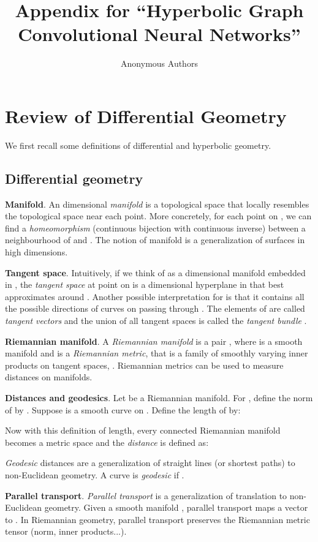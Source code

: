 \documentclass{article}
\title{Appendix for ``Hyperbolic Graph Convolutional Neural Networks''}
\author{Anonymous Authors
}
\newcommand{\xhdr}[1]{{\noindent\bfseries #1}.}
\begin{document}
\maketitle

\appendix
\section{Review of Differential Geometry}\label{appendix:diff_geom}
We first recall some definitions of differential and hyperbolic geometry.

\subsection{Differential geometry}
\xhdr{Manifold} An dimensional \textit{manifold}  is a topological space that locally resembles the topological space  near each point. 
More concretely, for each point  on , we can find a \textit{homeomorphism} (continuous bijection with continuous inverse) between a neighbourhood of  and .
The notion of manifold is a generalization of surfaces in high dimensions.

\xhdr{Tangent space}
Intuitively, if we think of  as a dimensional manifold embedded in , the \textit{tangent space}  at point  on  is a dimensional hyperplane in  that best approximates  around . Another possible interpretation for  is that it contains all the possible directions of curves on  passing through .
The elements of  are called \textit{tangent vectors} and the union of all tangent spaces is called the \textit{tangent bundle} . 

\xhdr{Riemannian manifold} A \textit{Riemannian manifold} is a pair , where  is a smooth manifold and  is a \textit{Riemannian metric}, that is a family of smoothly varying inner products on tangent spaces, .
Riemannian metrics can be used to measure distances on manifolds. 

\xhdr{Distances and geodesics} Let  be a Riemannian manifold. For , define the norm of  by .
Suppose  is a smooth curve on . Define the length of  by: 

Now with this definition of length, every connected Riemannian manifold  becomes a metric space and the \textit{distance}  is defined as:

\textit{Geodesic} distances are a generalization of straight lines (or shortest paths) to non-Euclidean geometry. 
A curve  is \textit{geodesic} if .

\xhdr{Parallel transport} \textit{Parallel transport} is a generalization of translation to non-Euclidean geometry.
Given a smooth manifold , parallel transport  maps a vector  to . 
In Riemannian geometry, parallel transport preserves the Riemannian metric tensor (norm, inner products...).
\end{document}
